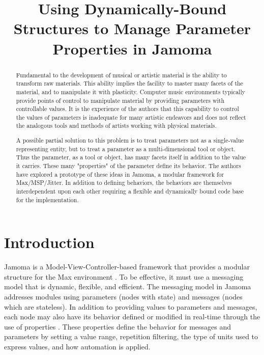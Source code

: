\documentclass{article}
\title{Using Dynamically-Bound Structures to Manage Parameter Properties in Jamoma}
\begin{document}
%
\maketitle
%
\begin{abstract}

Fundamental to the development of musical or artistic material is the ability to transform raw materials.  This ability implies the facility to master many facets of the material, and to manipulate it with plasticity.  Computer music environments typically provide points of control to manipulate material by providing parameters with controllable values.  It is the experience of the authors that this capability to control the values of parameters is inadequate for many artistic endeavors and does not reflect the analogous tools and methods of artists working with physical materials.  

A possible partial solution to this problem is to treat parameters not as a single-value representing entity, but to treat a parameter as a multi-dimensional tool or object.  Thus the parameter, as a tool or object, has many facets itself in addition to the value it carries.  These many "properties" of the parameter define its behavior.  The authors have explored a prototype of these ideas in Jamoma, a modular framework for Max/MSP/Jitter.  In addition to defining behaviors, the behaviors are themselves interdependent upon each other requiring a flexible and dynamically bound code base for the implementation.

\end{abstract}




%
\section{Introduction}\label{sec:introduction}

Jamoma is a Model-View-Controller-based framework that provides a modular structure for the Max environment \cite{Place:2006}.  To be effective, it must use a messaging model that is dynamic, flexible, and efficient. The messaging model in Jamoma addresses modules using parameters (nodes with state) and messages (nodes which are stateless). In addition to providing values to parameters and messages, each node may also have its behavior defined or modified in real-time through the use of properties \cite{Place:2008}.  %
These properties define the behavior for messages and parameters by setting a value range, repetition filtering, the type of units used to express values, and how automation is applied.
\end{document}
